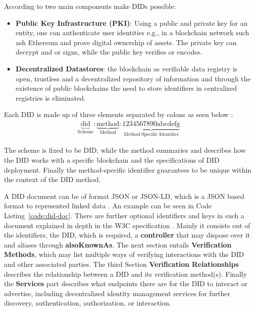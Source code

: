 According to \cite{eth-decentralized-identity} two main components make DIDs possible:
\begin{itemize}
	\item \textbf{Public Key Infrastructure (PKI)}: Using a public and private key for an entity, one can
	      authenticate user identities e.g., in a blockchain network such ash Ethereum and prove digital ownership
	      of assets.
	      The private key can decrypt and or signs, while the public key verifies or encodes.
	\item \textbf{Decentralized Datastores}: the blockchain as verifiable data registry is open, trustless and a
	      decentralized repository of information and through the existence of public blockchains the need to store
	      identifiers in centralized registries is eliminated.
\end{itemize}

Each DID is made up of three elements separated by colons as seen below \cite{w3c2022did}:
\begin{align*}
	\underbrace{\text{did}}_{\text{Scheme}} :
	\underbrace{\text{method}}_{\text{Method}} :
	\underbrace{\text{1234567890abcdefg}}_{\text{Method-Specific Identifier}}
\end{align*}

The scheme is fixed to be DID, while the method summaries and describes how the DID works with a specific blockchain
and the specifications of DID deployment. Finally the method-specific identifier guarantees to be unique within the
context of the DID method.

A DID document can be of format JSON or JSON-LD, which is a JSON based format to represented linked data \cite{w3c2022did}.
An example can be seen in Code Listing~\ref{code:did-doc}. There are further optional identifiers and keys in such a
document explained in depth in the W3C specification \cite{w3c2022did}. Mainly it consists out of the identifiers, the
DID, which is required, a \textbf{controller} that may dispose over it and aliases through \textbf{alsoKnownAs}.
The next section entails \textbf{Verification Methods}, which may list multiple ways of verifying interactions with the
DID and other associated parties. The third Section \textbf{Verification Relationships} describes the relationship
between a DID and its verification method(s).
Finally the \textbf{Services} part describes what endpoints there are for the DID to interact or advertise, including
decentralized identity management services for further discovery, authentication, authorization, or interaction.

